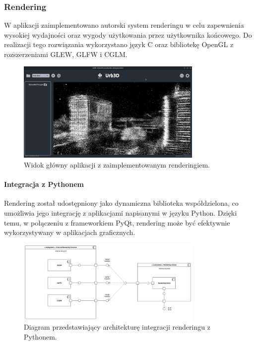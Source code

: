 \subsubsection{Rendering}

W aplikacji zaimplementowano autorski system renderingu w celu zapewnienia wysokiej wydajności oraz wygody użytkowania przez użytkownika końcowego. Do realizacji tego rozwiązania wykorzystano język C oraz bibliotekę OpenGL z rozszerzeniami GLEW, GLFW i CGLM.

\begin{figure}[h!]
    \centering
    \includegraphics[width=0.8\textwidth]{img/wizualizacja/ui_rendering.png}
    \caption{Widok główny aplikacji z zaimplementowanym renderingiem.}
    \label{fig:widok_glowny}
\end{figure}

\paragraph{Integracja z Pythonem}
Rendering został udostępniony jako dynamiczna biblioteka współdzielona, co umożliwia jego integrację z aplikacjami napisanymi w języku Python. Dzięki temu, w połączeniu z frameworkiem PyQt, rendering może być efektywnie wykorzystywany w aplikacjach graficznych.

\begin{figure}[h!]
    \centering
    \includegraphics[width=0.8\textwidth]{img/diagramy/diagram_komp_rendering.png}
    \caption{Diagram przedstawiający architekturę integracji renderingu z Pythonem.}
    \label{fig:diagram}
\end{figure}


